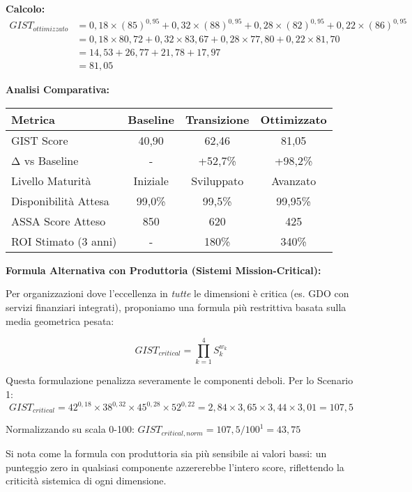 \begin{tcolorbox}
\textbf{Calcolo:}
\begin{align}
GIST_{ottimizzato} &= 0,18 \times (85)^{0,95} + 0,32 \times (88)^{0,95} + 0,28 \times (82)^{0,95} + 0,22 \times (86)^{0,95} \\
&= 0,18 \times 80,72 + 0,32 \times 83,67 + 0,28 \times 77,80 + 0,22 \times 81,70 \\
&= 14,53 + 26,77 + 21,78 + 17,97 \\
&= \boxed{81,05}
\end{align}

\vspace{0.5cm}
\textbf{Analisi Comparativa:}

\begin{center}
\begin{tabular}{lccc}
\toprule
\textbf{Metrica} & \textbf{Baseline} & \textbf{Transizione} & \textbf{Ottimizzato} \\
\midrule
GIST Score & 40,90 & 62,46 & 81,05 \\
Δ vs Baseline & - & +52,7\% & +98,2\% \\
Livello Maturità & Iniziale & Sviluppato & Avanzato \\
Disponibilità Attesa & 99,0\% & 99,5\% & 99,95\% \\
ASSA Score Atteso & 850 & 620 & 425 \\
ROI Stimato (3 anni) & - & 180\% & 340\% \\
\bottomrule
\end{tabular}
\end{center}

\vspace{0.5cm}
\textbf{Formula Alternativa con Produttoria (Sistemi Mission-Critical):}

Per organizzazioni dove l'eccellenza in \textit{tutte} le dimensioni è critica (es. GDO con servizi finanziari integrati), proponiamo una formula più restrittiva basata sulla media geometrica pesata:

$$GIST_{critical} = \prod_{k=1}^{4} S_k^{w_k}$$

Questa formulazione penalizza severamente le componenti deboli. Per lo Scenario 1:
$$GIST_{critical} = 42^{0,18} \times 38^{0,32} \times 45^{0,28} \times 52^{0,22} = 2,84 \times 3,65 \times 3,44 \times 3,01 = \boxed{107,5}$$

Normalizzando su scala 0-100: $GIST_{critical,norm} = 107,5 / 100^{1} = 43,75$

Si nota come la formula con produttoria sia più sensibile ai valori bassi: un punteggio zero in qualsiasi componente azzererebbe l'intero score, riflettendo la criticità sistemica di ogni dimensione.


\end{tcolorbox}
